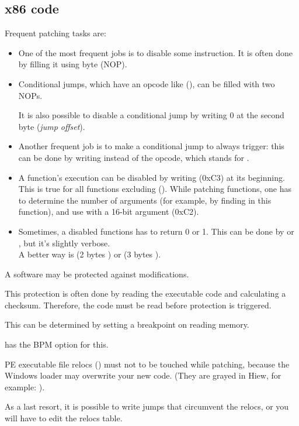 \label{patching}

\subsection{x86 code}
\label{x86_patching}

Frequent patching tasks are:

\begin{itemize}

\item 
One of the most frequent jobs is to disable some instruction.
It is often done by filling it using byte 
 (\ac{NOP}).

\item Conditional jumps, which have an opcode like  (\JZ), 
can be filled with two \ac{NOP}s.

It is also possible to disable a conditional jump by writing 0 at the second byte (\emph{jump offset}).

\item 
Another frequent job is to make a conditional jump to always trigger: 
this can be done by writing  
instead of the opcode, which stands for \JMP.

\item A function's execution can be disabled by writing \RETN (0xC3) at its beginning.
This is true for all functions excluding  ().
While patching  functions, one has to determine the number of arguments (for example, 
by finding \RETN in this function), 
and use \RETN with a 16-bit argument (0xC2).

\item Sometimes, a disabled functions has to return 0 or 1.
This can be done by  or , 
but it's slightly verbose.\\
A better way is  (2 bytes ) or  (3 bytes ).

\end{itemize}

A software may be protected against modifications.

This protection is often done by reading the executable code and calculating a checksum.
Therefore, 
the code must be read before protection is triggered.

This can be determined by setting a breakpoint on reading memory.

\tracer has the BPM option for this.

PE executable file relocs () 
must not to be touched while patching, 
because the Windows loader may overwrite your new code.
(They are grayed in Hiew, for example:
).

As a last resort, it is possible to write jumps that circumvent the relocs, 
or you will have to edit the relocs table.

